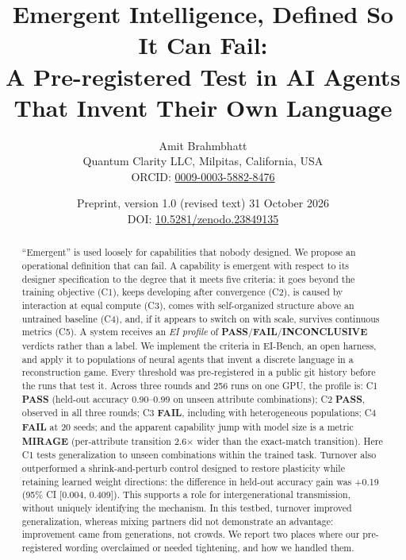 \documentclass[11pt]{article}
\title{\textbf{Emergent Intelligence, Defined So It Can Fail:}\\[2pt]
A Pre-registered Test in AI Agents\\ That Invent Their Own Language}
\author{Amit Brahmbhatt\\[2pt]
\small Quantum Clarity LLC, Milpitas, California, USA\\
\small ORCID: \href{https://orcid.org/0009-0003-5882-8476}{0009-0003-5882-8476}}
\date{\small Preprint, version 1.0 (revised text) \textbullet{} 31 October 2026\\
DOI: \href{https://doi.org/10.5281/zenodo.23849135}{10.5281/zenodo.23849135}}
\newcommand{\pass}{\textbf{PASS}}
\newcommand{\fail}{\textbf{FAIL}}
\newcommand{\inc}{\textbf{INCONCLUSIVE}}
\newcommand{\mirage}{\textbf{MIRAGE}}
\begin{document}
\maketitle

\begin{abstract}
\noindent
``Emergent'' is used loosely for capabilities that nobody designed. We propose an operational
definition that can fail. A capability is emergent with respect to its designer specification to
the degree that it meets five criteria: it goes beyond the training objective (C1), keeps
developing after convergence (C2), is caused by interaction at equal compute (C3), comes with
self-organized structure above an untrained baseline (C4), and, if it appears to switch on with
scale, survives continuous metrics (C5). A system receives an \emph{EI profile} of
\pass/\fail/\inc{} verdicts rather than a label. We implement the criteria in EI-Bench, an
open harness, and apply it to populations of neural agents that invent a discrete language in a
reconstruction game. Every threshold was pre-registered in a public git history before the runs
that test it. Across three rounds and 256 runs on one GPU, the profile is: C1 \pass{}
(held-out accuracy 0.90--0.99 on unseen attribute combinations); C2 \pass{}, observed in all
three rounds; C3 \fail{}, including with heterogeneous populations; C4 \fail{} at 20 seeds; and
the apparent capability jump with model size is a metric \mirage{} (per-attribute transition
2.6$\times$ wider than the exact-match transition). Here C1 tests generalization to unseen
combinations within the trained task. Turnover also outperformed a shrink-and-perturb control
designed to restore plasticity while retaining learned weight directions: the difference in
held-out accuracy gain was +0.19 (95\% CI [0.004, 0.409]). This supports a role for
intergenerational transmission, without uniquely identifying the mechanism. In this testbed,
turnover improved generalization, whereas mixing partners did not demonstrate an advantage:
improvement came from generations, not crowds. We report two places where our pre-registered
wording overclaimed or needed tightening, and how we handled them.
\end{abstract}
\end{document}
